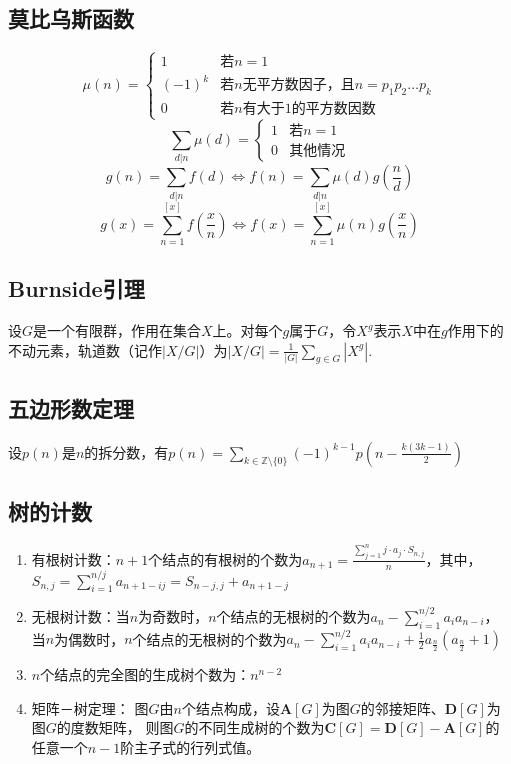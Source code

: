 \begin{spacing}{0.1}
\subsection*{莫比乌斯函数}
	$$\mu(n) = \begin{cases}
		1 & \text{若}n=1\\
		(-1)^k & \text{若}n\text{无平方数因子，且}n = p_1p_2\dots p_k\\
		0 & \text{若}n\text{有大于}1\text{的平方数因数}
	\end{cases}$$
	$$\sum_{d|n}{\mu(d)} = \begin{cases}
		1 & \text{若}n=1\\
		0 & \text{其他情况}
	\end{cases}$$
	$$g(n) = \sum_{d|n}{f(d)} \Leftrightarrow f(n) = \sum_{d|n}{\mu(d)g(\frac{n}{d})}$$
	$$g(x) = \sum_{n=1}^{[x]}f(\frac{x}{n}) \Leftrightarrow f(x) = \sum_{n=1}^{[x]}{\mu(n)g(\frac{x}{n})}$$
\subsection*{Burnside引理}
	设$G$是一个有限群，作用在集合$X$上。对每个$g$属于$G$，令$X^g$表示$X$中在$g$作用下的不动元素，轨道数（记作$|X/G|$）为$\displaystyle |X/G| = \frac{1}{|G|}\sum_{g \in G}|X^g|.\,$
\subsection*{五边形数定理}
	设$p(n)$是$n$的拆分数，有$\displaystyle p(n) = \sum_{k \in \mathbb{Z} \setminus \{0\}} (-1)^{k - 1} p\left(n - \frac{k(3k - 1)}{2}\right)$
\subsection*{树的计数}
	\begin{enumerate}
		\item 有根树计数：$n+1$个结点的有根树的个数为$\displaystyle a_{n+1} = \frac{\sum_{j=1}^{n}{j \cdot a_j \cdot{S_{n, j}}}}{n}$，其中，$\displaystyle S_{n, j} = \sum_{i=1}^{n/j}{a_{n+1-ij}} = S_{n-j, j} + a_{n+1-j}$
		\item 无根树计数：当$n$为奇数时，$n$个结点的无根树的个数为$a_n-\sum_{i=1}^{n/2}{a_ia_{n-i}}$，当$n$为偶数时，$n$个结点的无根树的个数为$a_n-\sum_{i=1}^{n/2}{a_ia_{n-i}}+\frac{1}{2}a_{\frac{n}{2}}(a_{\frac{n}{2}}+1)$
		\item $n$个结点的完全图的生成树个数为：$\displaystyle n^{n-2}$
		\item 矩阵－树定理：
		图$G$由$n$个结点构成，设$\bm{A}[G]$为图$G$的邻接矩阵、$\bm{D}[G]$为图$G$的度数矩阵，
		则图$G$的不同生成树的个数为$\bm{C}[G] = \bm{D}[G] - \bm{A}[G]$的任意一个$n-1$阶主子式的行列式值。
	\end{enumerate}

\end{spacing}
